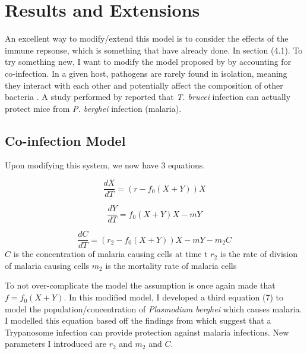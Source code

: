 \documentclass[11pt]{article}
\begin{document}
	\section{Results and Extensions}
	
	An excellent way to modify/extend this model is to consider the effects of the immune repsonse, which is something that \citet{tyler2001limitation} have already done. In section (4.1). To try something new, I want to modify the model proposed by \citet{tyler2001limitation} by accounting for co-infection. In a given host, pathogens are rarely found in isolation, meaning they interact with each other and potentially affect the composition of other bacteria \citep{venter2022parasite}. A study performed by \citet{sanches2019trypanosoma} reported that \textit{T. brucei} infection can actually protect mice from \textit{P. berghei} infection (malaria).
	
	\subsection{Co-infection Model}
	Upon modifying this system, we now have 3 equations.
	
	\begin{equation}
		\frac{dX}{dT} = (r-f_0(X+Y))X
	\end{equation}
	
	\begin{equation}
		\frac{dY}{dT} = f_0(X+Y)X-mY
	\end{equation}

	\begin{equation}
		\frac{dC}{dT} = (r_2 -f_0(X+Y))X-mY-m_2C
	\end{equation}
	$C$ is the concentration of malaria causing cells at time t \newline
	$r_2$ is the rate of division of malaria causing cells \newline
	$m_2$ is the mortality rate of malaria cells\newline	
	
	
	To not over-complicate the model the assumption is once again made that $f = f_0(X+Y)$. In this modified model, I developed a third equation (7) to model the population/concentration of \textit{Plasmodium berghei} which causes malaria. I modelled this equation based off the findings from \citet{sanches2019trypanosoma} which suggest that a Trypanosome infection can provide protection against malaria infections. New parameters I introduced are $r_2$ and $m_2$ and $C$.
	
\end{document}
